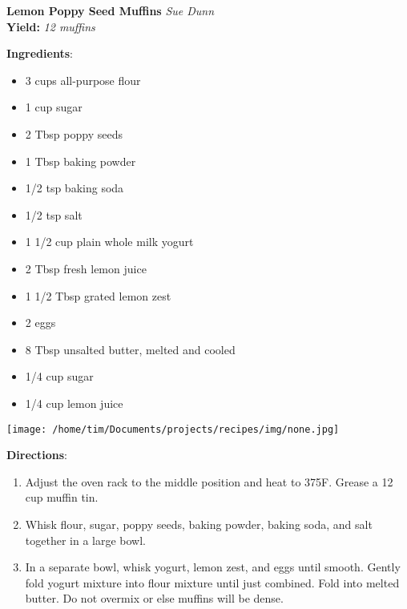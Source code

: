 \documentclass[11pt, twoside, openany]{book}
\begin{document}
\noindent\begin{minipage}[t]{\linewidth}%
{\Large\textbf{Lemon Poppy Seed Muffins}} \label{lemon-poppy-seed-muffins}\hfill\textit{Sue Dunn}\\
\textbf{Yield:} \textit{12 muffins}\\
\noindent\begin{minipage}[t]{0.78\linewidth}%
\textbf{Ingredients}:\vspace{-3mm}
\begin{multicols}{2}
\begin{itemize}\setlength\itemsep{-1mm}
\item 3 cups all-purpose flour
\item 1 cup sugar
\item 2 Tbsp poppy seeds
\item 1 Tbsp baking powder
\item 1/2 tsp baking soda
\item 1/2 tsp salt
\item 1 1/2 cup plain whole milk yogurt
\item 2 Tbsp fresh lemon juice
\item 1 1/2 Tbsp grated lemon zest
\item 2 eggs
\item 8 Tbsp unsalted butter, melted and cooled
\item 1/4 cup sugar
\item 1/4 cup lemon juice
\end{itemize}
\end{multicols}
\end{minipage}
\noindent\begin{minipage}[t]{0.18\linewidth}
\centering \strut\vspace*{-\baselineskip}\newline
\texttt{[image: /home/tim/Documents/projects/recipes/img/none.jpg]}\\
\end{minipage}\vspace{3mm}
\textbf{Directions}:
\vspace{-3mm}\begin{enumerate}\setlength\itemsep{-1mm}
\item Adjust the oven rack to the middle position and heat to 375F. Grease a 12 cup muffin tin.
\item Whisk flour, sugar, poppy seeds, baking powder, baking soda, and salt together in a large bowl.
\item In a separate bowl, whisk yogurt, lemon zest, and eggs until smooth. Gently fold yogurt mixture into flour mixture until just combined. Fold into melted butter. Do not overmix or else muffins will be dense.

\end{enumerate}
\end{minipage}
\end{document}
